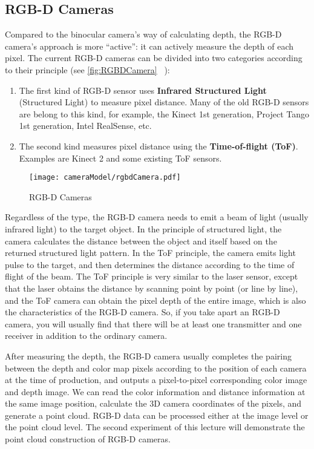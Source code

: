 \subsection{RGB-D Cameras}
Compared to the binocular camera's way of calculating depth, the RGB-D camera's approach is more ``active'': it can actively measure the depth of each pixel. The current RGB-D cameras can be divided into two categories according to their principle (see \autoref {fig:RGBDCamera} ~):

\begin{enumerate}
\item The first kind of RGB-D sensor uses \textbf{Infrared Structured Light} (Structured Light) to measure pixel distance. Many of the old RGB-D sensors are belong to this kind, for example, the Kinect 1st generation, Project Tango 1st generation, Intel RealSense, etc.
\item The second kind measures pixel distance using the \textbf{Time-of-flight (ToF)}. Examples are Kinect 2 and some existing ToF sensors.
\end{enumerate}

\begin{figure}[!ht]
    \centering
    \texttt{[image: cameraModel/rgbdCamera.pdf]}
    \caption{RGB-D Cameras}
    \label{fig:RGBDCamera}
\end{figure}

Regardless of the type, the RGB-D camera needs to emit a beam of light (usually infrared light) to the target object. In the principle of structured light, the camera calculates the distance between the object and itself based on the returned structured light pattern. In the ToF principle, the camera emits light pulse to the target, and then determines the distance according to the time of flight of the beam. The ToF principle is very similar to the laser sensor, except that the laser obtains the distance by scanning point by point (or line by line), and the ToF camera can obtain the pixel depth of the entire image, which is also the characteristics of the RGB-D camera. So, if you take apart an RGB-D camera, you will usually find that there will be at least one transmitter and one receiver in addition to the ordinary camera.

After measuring the depth, the RGB-D camera usually completes the pairing between the depth and color map pixels according to the position of each camera at the time of production, and outputs a pixel-to-pixel corresponding color image and depth image. We can read the color information and distance information at the same image position, calculate the 3D camera coordinates of the pixels, and generate a point cloud. RGB-D data can be processed either at the image level or the point cloud level. The second experiment of this lecture will demonstrate the point cloud construction of RGB-D cameras.

